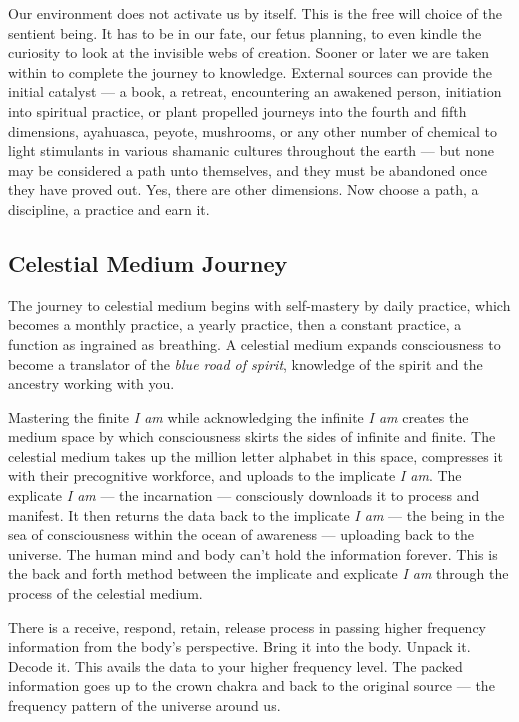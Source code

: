 \documentclass[letterpaper,11pt,twoside,titlepage,onecolumn,openany]{book}
\begin{document}
Our environment does not activate us by itself. This is the free will
choice of the sentient being. It has to be in our fate, our fetus
planning, to even kindle the curiosity to look at the invisible webs of
creation. Sooner or later we are taken within to complete the journey to
knowledge. External sources can provide the initial catalyst --- a book,
a retreat, encountering an awakened person, initiation into spiritual
practice, or plant propelled journeys into the fourth and fifth
dimensions, ayahuasca, peyote, mushrooms, or any other number of
chemical to light stimulants in various shamanic cultures throughout the
earth --- but none may be considered a path unto themselves, and they
must be abandoned once they have proved out. Yes, there are other
dimensions. Now choose a path, a discipline, a practice and earn it.

\subsection*{Celestial Medium Journey}\label{celestial-medium-journey}

The journey to celestial medium begins with self-mastery by daily
practice, which becomes a monthly practice, a yearly practice, then a
constant practice, a function as ingrained as breathing. A celestial
medium expands consciousness to become a translator of the \emph{blue
road of spirit}, knowledge of the spirit and the ancestry working with
you.

Mastering the finite \emph{I am} while acknowledging the infinite
\emph{I am} creates the medium space by which consciousness skirts the
sides of infinite and finite. The celestial medium takes up the million
letter alphabet in this space, compresses it with their precognitive
workforce, and uploads to the implicate \emph{I am}. The explicate
\emph{I am} --- the incarnation --- consciously downloads it to process
and manifest. It then returns the data back to the implicate \emph{I am}
--- the being in the sea of consciousness within the ocean of awareness
--- uploading back to the universe. The human mind and body can't hold
the information forever. This is the back and forth method between the
implicate and explicate \emph{I am} through the process of the celestial
medium.

There is a receive, respond, retain, release process in passing higher
frequency information from the body's perspective. Bring it into the
body. Unpack it. Decode it. This avails the data to your higher
frequency level. The packed information goes up to the crown chakra and
back to the original source --- the frequency pattern of the universe
around us.
\end{document}

